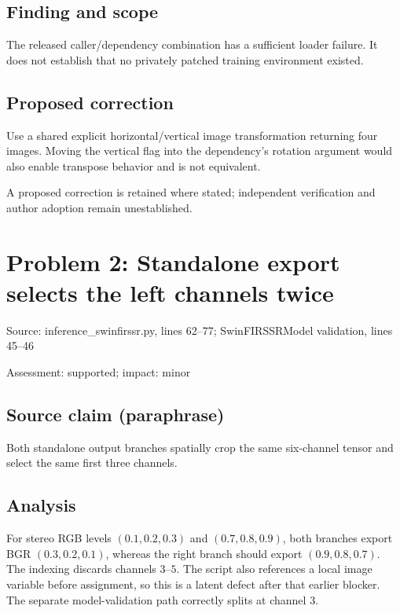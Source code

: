 \documentclass[11pt]{article}
\begin{document}
\subsection*{Finding and scope}

The released caller/dependency combination has a sufficient loader failure. It does not establish that no privately patched training environment existed.

\subsection*{Proposed correction}

Use a shared explicit horizontal/vertical image transformation returning four images. Moving the vertical flag into the dependency’s rotation argument would also enable transpose behavior and is not equivalent.

A proposed correction is retained where stated; independent verification and author adoption remain unestablished.

\section*{Problem 2: Standalone export selects the left channels twice}

Source: inference\_swinfirssr.py, lines 62–77; SwinFIRSSRModel validation, lines 45–46

Assessment: supported; impact: minor

\subsection*{Source claim (paraphrase)}

Both standalone output branches spatially crop the same six-channel tensor and select the same first three channels.

\subsection*{Analysis}

For stereo RGB levels \((0.1,0.2,0.3)\) and \((0.7,0.8,0.9)\), both branches export BGR \((0.3,0.2,0.1)\), whereas the right branch should export \((0.9,0.8,0.7)\). The indexing discards channels \(3\)–\(5\). The script also references a local image variable before assignment, so this is a latent defect after that earlier blocker. The separate model-validation path correctly splits at channel \(3\).
\end{document}
